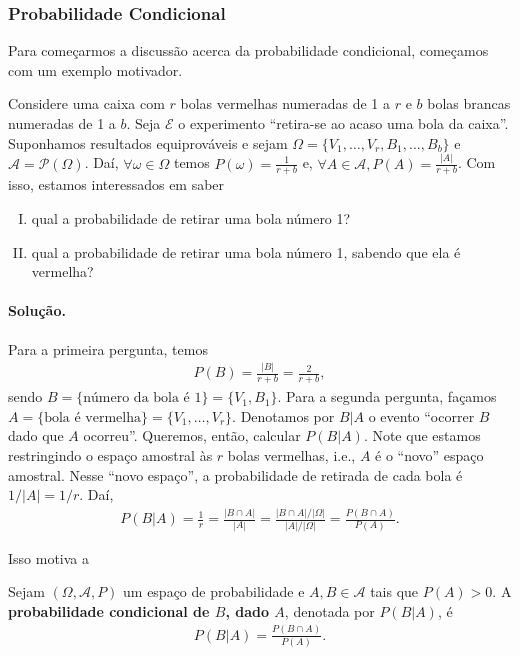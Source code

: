 \documentclass[../Notas.tex]{subfiles}
\begin{document}
\subsubsection{Probabilidade Condicional}
Para começarmos a discussão acerca da probabilidade condicional, começamos com um exemplo motivador.
\begin{example}
Considere uma caixa com $r$ bolas vermelhas numeradas de 1 a $r$ e $b$ bolas brancas numeradas de 1 a $b$. Seja $\mathcal{E}$ o experimento ``retira-se ao acaso uma bola da caixa''. Suponhamos resultados equiprováveis e sejam $\Omega = \{ V_1, \dots, V_r, B_1, \dots, B_b \}$ e $\mathcal{A} = \mathcal{P}(\Omega)$. Daí, $\forall \omega\in\Omega$ temos $P(\omega) = \displaystyle{\frac{1}{r+b}}$ e, $\forall A\in\mathcal{A}, P(A) = \displaystyle{\frac{|A|}{r+b}}$. Com isso, estamos interessados em saber
\begin{enumerate}[(I)]
    \item qual a probabilidade de retirar uma bola número 1?
    \item qual a probabilidade de retirar uma bola número 1, sabendo que ela é vermelha?
\end{enumerate}
\paragraph{Solução.} Para a primeira pergunta, temos
\begin{align*}
    P(B) = \frac{|B|}{r+b} = \frac{2}{r+b},
\end{align*}
sendo $B = \{ \text{número da bola é } 1 \} = \{V_1, B_1\}$. Para a segunda pergunta, façamos $A = \{ \text{bola é vermelha} \} = \{ V_1, \dots, V_r \}$. Denotamos por $B|A$ o evento ``ocorrer $B$ dado que $A$ ocorreu''. Queremos, então, calcular $P(B|A)$. Note que estamos restringindo o espaço amostral às $r$ bolas vermelhas, i.e., $A$ é o ``novo'' espaço amostral. Nesse ``novo espaço'', a probabilidade de retirada de cada bola é $1/|A| = 1/r$. Daí,
\begin{align*}
    P(B|A) = \frac{1}{r} = \frac{|B\cap A|}{|A|} = \frac{|B\cap A|/|\Omega|}{|A|/|\Omega|} = \frac{P(B\cap A)}{P(A)}.
\end{align*}
\end{example}

Isso motiva a
\begin{definition}
Sejam $(\Omega, \mathcal{A}, P)$ um espaço de probabilidade e $A, B\in\mathcal{A}$ tais que $P(A) > 0$. A \textbf{probabilidade condicional de $B$, dado $A$}, denotada por $P(B|A)$, é
\begin{align*}
    P(B|A) = \frac{P(B\cap A)}{P(A)}.
\end{align*}
\end{definition}
\end{document}
